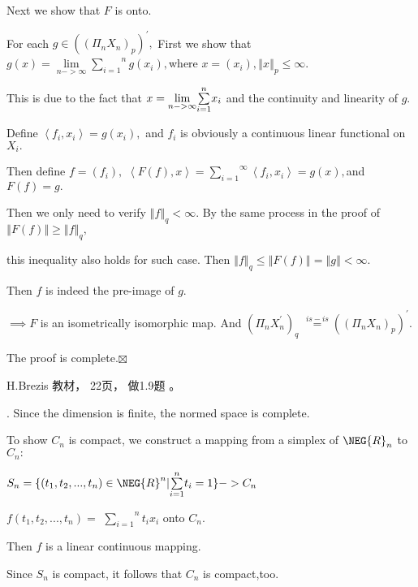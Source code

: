 \documentclass{article}
\begin{document}
Next we show that $F$ is onto.

For each $g\in \left( \left( \Pi _{n}X_{n}\right) _{p}\right) ^{\prime },$%
First we show that $g\left( x\right) =\underset{n->\infty }{\lim }\overset{n}%
{\underset{i=1}{\sum }}g\left( x_{i}\right) ,$where $x=\left( x_{i}\right)
,\left\Vert x\right\Vert _{p}\leq \infty .$

This is due to the fact that $x=\underset{n->\infty }{\lim }\overset{n}{%
\underset{i=1}{\sum }}x_{i}$ and the continuity and linearity of $g.$

Define $\left\langle f_{i},x_{i}\right\rangle =g\left( x_{i}\right) ,$ and $%
f_{i}$ is obviously a continuous linear functional on $X_{i}.$

Then define $f=\left( f_{i}\right) ,$ $\left\langle F\left( f\right)
,x\right\rangle =\overset{\infty }{\underset{i=1}{\sum }}\left\langle
f_{i},x_{i}\right\rangle =g\left( x\right) ,$and $F\left( f\right) =g.$

Then we only need to verify $\left\Vert f\right\Vert _{q}<\infty .$ By the
same process in the proof of $\left\Vert F\left( f\right) \right\Vert \geq
\left\Vert f\right\Vert _{q},$

this inequality also holds for such case. Then $\left\Vert f\right\Vert
_{q}\leq \left\Vert F\left( f\right) \right\Vert =\left\Vert g\right\Vert
<\infty .$

\bigskip Then $f$ is indeed the pre-image of $g.$

$\implies F$ is an isometrically isomorphic map. And $\left( \Pi
_{n}X_{n}^{\prime }\right) _{q}$ $\overset{is-is}{=}\left( \left( \Pi
_{n}X_{n}\right) _{p}\right) ^{\prime }.$

The proof is complete.$\boxtimes $

H.Brezis 教材， 22页， 做1.9题%
。


. Since the dimension is finite, the normed space is complete.

To show $C_{n}$ is compact, we construct a mapping from a simplex of $\NEG%
{R}_{n}$ to $C_{n}:$

$S_{n}=\{\left( t_{1},t_{2},...,t_{n}\right) \in \NEG{R}^{n}|\overset{n}{%
\underset{i=1}{\sum }}t_{i}=1\}->C_{n}$

$f\left( t_{1},t_{2},...,t_{n}\right) =$ $\overset{n}{\underset{i=1}{\sum }}%
t_{i}x_{i}$ onto $C_{n}.$

Then $f$ is a linear continuous mapping.

Since $S_{n}$ is compact, it follows that $C_{n}$ is compact,too. 
\end{document}
